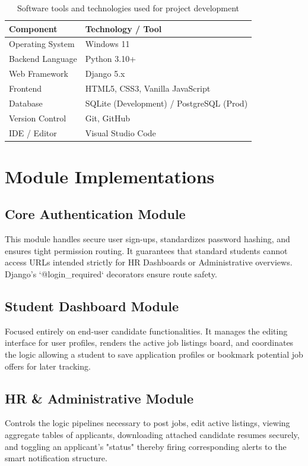 \documentclass[a4paper,12pt]{report}
\begin{document}
\begin{table}[H]
\centering
\caption{Software tools and technologies used for project development}
\label{tab:tools}
\renewcommand{\arraystretch}{1.3}
\vspace{10pt}
\begin{tabular}{|l|p{9cm}|}
\hline
\textbf{Component} & \textbf{Technology / Tool} \\
\hline
Operating System  & Windows 11 \\
Backend Language  & Python 3.10+ \\
Web Framework     & Django 5.x \\
Frontend          & HTML5, CSS3, Vanilla JavaScript \\
Database          & SQLite (Development) / PostgreSQL (Prod) \\
Version Control   & Git, GitHub \\
IDE / Editor      & Visual Studio Code \\
\hline
\end{tabular}
\end{table}

\section{Module Implementations}

\subsection{Core Authentication Module}
This module handles secure user sign-ups, standardizes password hashing, and ensures tight permission routing. It guarantees that standard students cannot access URLs intended strictly for HR Dashboards or Administrative overviews. Django's `@login_required` decorators ensure route safety.

\subsection{Student Dashboard Module}
Focused entirely on end-user candidate functionalities. It manages the editing interface for user profiles, renders the active job listings board, and coordinates the logic allowing a student to save application profiles or bookmark potential job offers for later tracking.

\subsection{HR \& Administrative Module}
Controls the logic pipelines necessary to post jobs, edit active listings, viewing aggregate tables of applicants, downloading attached candidate resumes securely, and toggling an applicant's "status" thereby firing corresponding alerts to the smart notification structure.
\end{document}
